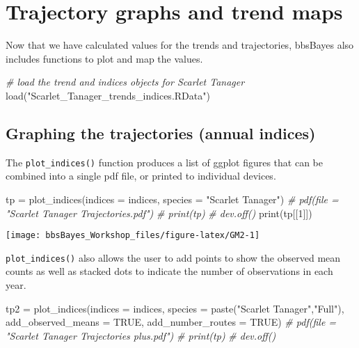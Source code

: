 \documentclass[
]{book}
\newenvironment{Shaded}{\begin{snugshade}}{\end{snugshade}}
\newcommand{\AttributeTok}[1]{\textcolor[rgb]{0.77,0.63,0.00}{#1}}
\newcommand{\CommentTok}[1]{\textcolor[rgb]{0.56,0.35,0.01}{\textit{#1}}}
\newcommand{\ConstantTok}[1]{\textcolor[rgb]{0.00,0.00,0.00}{#1}}
\newcommand{\DecValTok}[1]{\textcolor[rgb]{0.00,0.00,0.81}{#1}}
\newcommand{\FunctionTok}[1]{\textcolor[rgb]{0.00,0.00,0.00}{#1}}
\newcommand{\NormalTok}[1]{#1}
\newcommand{\OtherTok}[1]{\textcolor[rgb]{0.56,0.35,0.01}{#1}}
\newcommand{\StringTok}[1]{\textcolor[rgb]{0.31,0.60,0.02}{#1}}
\begin{document}
\hypertarget{GraphMap}{%
\chapter{Trajectory graphs and trend maps}\label{GraphMap}}

Now that we have calculated values for the trends and trajectories, bbsBayes also includes functions to plot and map the values.

\begin{Shaded}
\begin{Highlighting}[]
\CommentTok{\# load the trend and indices objects for Scarlet Tanager}
\FunctionTok{load}\NormalTok{(}\StringTok{"Scarlet\_Tanager\_trends\_indices.RData"}\NormalTok{)}
\end{Highlighting}
\end{Shaded}

\hypertarget{graphing-the-trajectories-annual-indices}{%
\section{Graphing the trajectories (annual indices)}\label{graphing-the-trajectories-annual-indices}}

The \texttt{plot\_indices()} function produces a list of ggplot figures that can be combined into a single pdf file, or printed to individual devices.

\begin{Shaded}
\begin{Highlighting}[]
\NormalTok{tp }\OtherTok{=} \FunctionTok{plot\_indices}\NormalTok{(}\AttributeTok{indices =}\NormalTok{ indices,}
                         \AttributeTok{species =} \StringTok{"Scarlet Tanager"}\NormalTok{)}
 \CommentTok{\# pdf(file = "Scarlet Tanager Trajectories.pdf")}
 \CommentTok{\# print(tp)}
 \CommentTok{\# dev.off()}
\FunctionTok{print}\NormalTok{(tp[[}\DecValTok{1}\NormalTok{]])}
\end{Highlighting}
\end{Shaded}

\begin{center}\texttt{[image: bbsBayes\_Workshop\_files/figure-latex/GM2-1]} \end{center}

\texttt{plot\_indices()} also allows the user to add points to show the observed mean counts as well as stacked dots to indicate the number of observations in each year.

\begin{Shaded}
\begin{Highlighting}[]
\NormalTok{tp2 }\OtherTok{=} \FunctionTok{plot\_indices}\NormalTok{(}\AttributeTok{indices =}\NormalTok{ indices,}
                         \AttributeTok{species =} \FunctionTok{paste}\NormalTok{(}\StringTok{"Scarlet Tanager"}\NormalTok{,}\StringTok{"Full"}\NormalTok{),}
                  \AttributeTok{add\_observed\_means =} \ConstantTok{TRUE}\NormalTok{,}
                  \AttributeTok{add\_number\_routes =} \ConstantTok{TRUE}\NormalTok{)}
 \CommentTok{\# pdf(file = "Scarlet Tanager Trajectories plus.pdf")}
 \CommentTok{\# print(tp)}
 \CommentTok{\# dev.off()}
\end{Highlighting}
\end{Shaded}
\end{document}
